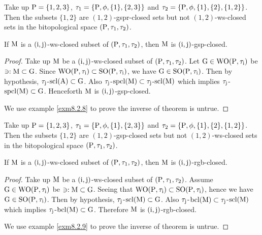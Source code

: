 \begin{exm}\label{exm8.2.7}
Take up $\mathrm{P}=\{1, 2, 3\}$, $\tau_1 =\{\mathrm{P}, \phi, \{1\}, \{ 2,3\}\}$ and $\tau_2 =\{\TSP, \phi, \{1\},\break \{2\},\{1,2\}\}$. Then the subsets $\{1,2\}$ are $(1, 2)$-gspr-closed sets but not $(1, 2)$-ws-closed sets in the bitopological space $(\mathrm{P}, \tau_1, \tau_2 )$.
\end{exm}

\begin{thm}\label{thm8.2.8}
If $\mathrm{M}$ is a $(\mathrm{i}, \mathrm{j})$-ws-closed subset of $(\mathrm{P}, \tau_1, \tau_2 )$, then $\mathrm{M}$ is $(\mathrm{i}, \mathrm{j})$-gsp-closed.
\end{thm}

\begin{proof}
Take up $\mathrm{M}$ be a $(\mathrm{i}, \mathrm{j})$-ws-closed subset of $(\mathrm{P}, \tau_1, \tau_2)$. Let $\mathrm{G}\in\mathrm{W}\mathrm{O}(\mathrm{P}, \tau_{\mathrm{i}} )$ be $\ni: \mathrm{M} \subset \mathrm{G}$. Since $\mathrm{W}\mathrm{O}(\mathrm{P}, \tau_{\mathrm{i}}) \subset \mathrm{S}\mathrm{O}(\mathrm{P}, \tau_{\mathrm{i}})$, we have $\mathrm{G}\in\mathrm{S}\mathrm{O}(\mathrm{P}, \tau_{\mathrm{i}})$. Then by hypothesis, $\tau_{\mathrm{j}}$-$\mathrm{scl}(\mathrm{A}) \subset \mathrm{G}$. Also $\tau_{\mathrm{j}}$-$\mathrm{spcl}(\mathrm{M}) \subset \tau_{\mathrm{j}}$-$\mathrm{scl}(\mathrm{M})$ which implies $\tau_{\mathrm{j}}$-$\mathrm{spcl}(\mathrm{M}) \subset \mathrm{G}$. Henceforth $\mathrm{M}$ is $(\mathrm{i}, \mathrm{j})$-gsp-closed.

We use example \ref{exm8.2.8} to prove the inverse of theorem is untrue.
\end{proof}

\begin{exm}\label{exm8.2.8}
Take up $\mathrm{P}=\{1,2,3\}$, $\tau_1 =\{\mathrm{P}, \phi, \{1\}, \{2, 3\}\}$ and $\tau_2 =\{\TSP, \phi, \{1\},\break \{2\},\{1,2\}\}$. Then the subsets $\{1,2\}$ are $(1, 2)$-gsp-closed sets but not $(1, 2)$-ws-closed sets in the bitopological space $(\mathrm{P}, \tau_1, \tau_2 )$.
\end{exm}

\begin{thm}\label{thm8.2.9}
If $\mathrm{M}$ is a $(\mathrm{i}, \mathrm{j})$-ws-closed subset of $(\mathrm{P}, \tau_1, \tau_2 )$, then $\mathrm{M}$ is $(\mathrm{i}, \mathrm{j})$-rgb-closed.
\end{thm}

\begin{proof}
Take up $\mathrm{M}$ be a $(\mathrm{i}, \mathrm{j})$-ws-closed subset of $(\mathrm{P}, \tau_1, \tau_2 )$. Assume $\mathrm{G}\in\mathrm{W}\mathrm{O}(\mathrm{P}, \tau_{\mathrm{i}} )$ be $\ni: \mathrm{M} \subset\mathrm{G}$. Seeing that $\mathrm{W}\mathrm{O}(\mathrm{P}, \tau_{\mathrm{i}} ) \subset \mathrm{S}\mathrm{O}(\mathrm{P}, \tau_{\mathrm{i}} )$, hence we have $\mathrm{G}\in\mathrm{SO}(\mathrm{P}, \tau_{\mathrm{i}} )$. Then by hypothesis, $\tau_{\mathrm{j}}$-$\mathrm{scl}(\mathrm{M}) \subset \mathrm{G}$. Also $\tau_{\mathrm{j}}$-$\mathrm{bcl}(\mathrm{M}) \subset \tau_{\mathrm{j}}$-$\mathrm{scl}(\mathrm{M})$ which implies $\tau_{\mathrm{j}}$-$\mathrm{bcl}(\mathrm{M}) \subset \mathrm{G}$. Therefore $\mathrm{M}$ is $(\mathrm{i}, \mathrm{j})$-rgb-closed.

We use example \ref{exm8.2.9} to prove the inverse of theorem is untrue.
\end{proof}

